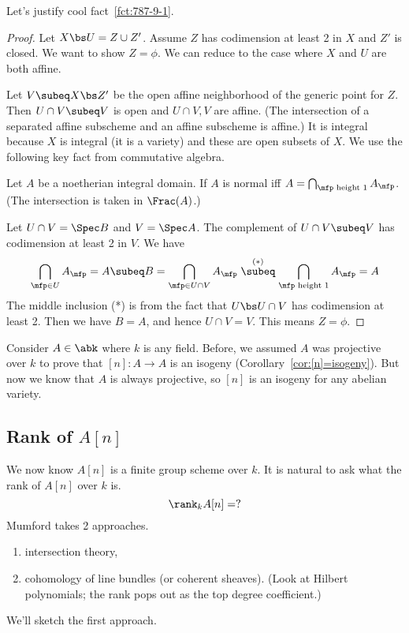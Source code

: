 Let's justify cool fact~\ref{fct:787-9-1}.
\begin{proof}
Let $X\bs U=Z\cup Z'$. Assume $Z$ has codimension at least 2 in $X$ and $Z'$ is closed. We want to show $Z=\phi$. We can reduce to the case where $X$ and $U$ are both affine. 

Let $V\subeq X\bs Z'$ be the open affine neighborhood of the generic point for $Z$. Then $U\cap V\subeq V$ is open and $U\cap V,V$ are affine. (The intersection of a separated affine subscheme and an affine subscheme is affine.) %
It is integral because $X$ is integral (it is a variety) and these are open subsets of $X$. We use the following key fact from commutative algebra. %

\begin{fct}
Let $A$ be a noetherian integral domain. 
If $A$ is normal iff $A=\bigcap_{\mfp\text{ height }1} A_{\mfp}$. (The intersection is taken in $\Frac(A)$.)
\end{fct}
Let $U\cap V=\Spec B$ and $V=\Spec A$. The complement of $U\cap V\subeq V$ has codimension at least 2 in $V$. 
We have
\[\bigcap_{\mfp\in U}A_{\mfp} =A\subeq B=\bigcap_{\mfp\in U\cap V}A_{\mfp}\stackrel{(*)}{\subeq} \bigcap_{\mfp\text{ height }1}A_{\mfp}=A\]
The middle inclusion (*) is from the fact that $U\bs U\cap V$ has codimension at least 2.
Then we have $B=A$, and hence $U\cap V=V$. This means $Z=\phi$. %
\end{proof}
Consider $A\in \abk$ where $k$ is any field. Before, we assumed $A$ was projective over $k$ to prove that $[n]:A\to A$ is an isogeny (Corollary~\ref{cor:[n]=isogeny}). But now we know that $A$ is always projective, so $[n]$ is an isogeny for any abelian variety.
\subsection{Rank of $A[n]$}
We now know $A[n]$ is a finite group scheme over $k$. 
It is natural to ask what the rank of $A[n]$ over $k$ is.
\[
\rank_k A[n]=?
\]
Mumford takes 2 approaches.
\begin{enumerate}
\item
intersection theory,
\item
cohomology of line bundles (or coherent sheaves). (Look at Hilbert polynomials; the rank pops out as the top degree coefficient.)
\end{enumerate}
We'll sketch the first approach.

